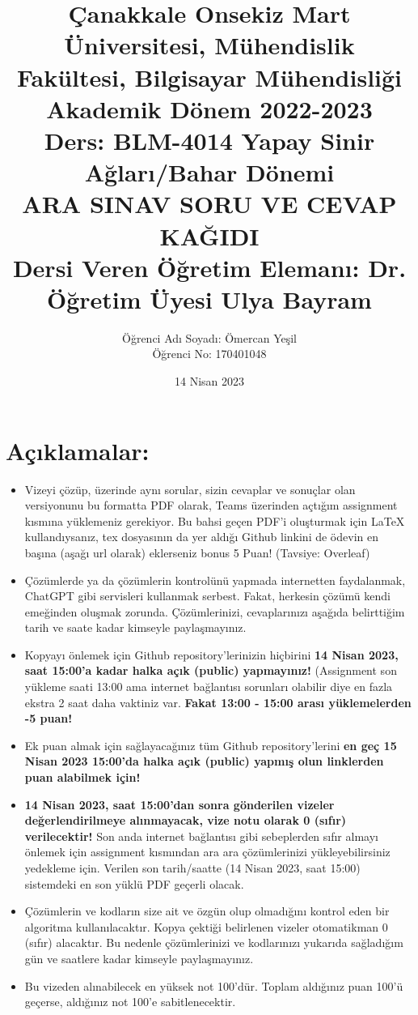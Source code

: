 \documentclass[11pt]{article}
\title{Çanakkale Onsekiz Mart Üniversitesi, Mühendislik Fakültesi, Bilgisayar Mühendisliği Akademik Dönem 2022-2023\\
Ders: BLM-4014 Yapay Sinir Ağları/Bahar Dönemi\\ 
ARA SINAV SORU VE CEVAP KAĞIDI\\
Dersi Veren Öğretim Elemanı: Dr. Öğretim Üyesi Ulya Bayram}
\author{%
\begin{minipage}{\textwidth}
\raggedright
Öğrenci Adı Soyadı: Ömercan Yeşil\\ %
Öğrenci No: 170401048
\end{minipage}%
}
\date{14 Nisan 2023}
\begin{document}
\maketitle

\vspace{-.5in}
\section*{Açıklamalar:}
\begin{itemize}
    \item Vizeyi çözüp, üzerinde aynı sorular, sizin cevaplar ve sonuçlar olan versiyonunu bu formatta PDF olarak, Teams üzerinden açtığım assignment kısmına yüklemeniz gerekiyor. Bu bahsi geçen PDF'i oluşturmak için LaTeX kullandıysanız, tex dosyasının da yer aldığı Github linkini de ödevin en başına (aşağı url olarak) eklerseniz bonus 5 Puan! (Tavsiye: Overleaf)
    \item Çözümlerde ya da çözümlerin kontrolünü yapmada internetten faydalanmak, ChatGPT gibi servisleri kullanmak serbest. Fakat, herkesin çözümü kendi emeğinden oluşmak zorunda. Çözümlerinizi, cevaplarınızı aşağıda belirttiğim tarih ve saate kadar kimseyle paylaşmayınız. 
    \item Kopyayı önlemek için Github repository'lerinizin hiçbirini \textbf{14 Nisan 2023, saat 15:00'a kadar halka açık (public) yapmayınız!} (Assignment son yükleme saati 13:00 ama internet bağlantısı sorunları olabilir diye en fazla ekstra 2 saat daha vaktiniz var. \textbf{Fakat 13:00 - 15:00 arası yüklemelerden -5 puan!}
    \item Ek puan almak için sağlayacağınız tüm Github repository'lerini \textbf{en geç 15 Nisan 2023 15:00'da halka açık (public) yapmış olun linklerden puan alabilmek için!}
    \item \textbf{14 Nisan 2023, saat 15:00'dan sonra gönderilen vizeler değerlendirilmeye alınmayacak, vize notu olarak 0 (sıfır) verilecektir!} Son anda internet bağlantısı gibi sebeplerden sıfır almayı önlemek için assignment kısmından ara ara çözümlerinizi yükleyebilirsiniz yedekleme için. Verilen son tarih/saatte (14 Nisan 2023, saat 15:00) sistemdeki en son yüklü PDF geçerli olacak.
    \item Çözümlerin ve kodların size ait ve özgün olup olmadığını kontrol eden bir algoritma kullanılacaktır. Kopya çektiği belirlenen vizeler otomatikman 0 (sıfır) alacaktır. Bu nedenle çözümlerinizi ve kodlarınızı yukarıda sağladığım gün ve saatlere kadar kimseyle paylaşmayınız.
    \item Bu vizeden alınabilecek en yüksek not 100'dür. Toplam aldığınız puan 100'ü geçerse, aldığınız not 100'e sabitlenecektir.

\end{itemize}
\end{document}
